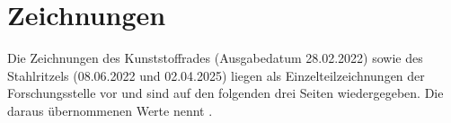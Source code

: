 \section{Zeichnungen}
\label{sec:anhang_a}

Die Zeichnungen des Kunststoffrades (Ausgabedatum 28.02.2022) sowie des Stahlritzels (08.06.2022 und 02.04.2025) liegen als Einzelteilzeichnungen der Forschungsstelle vor und sind auf den folgenden drei Seiten wiedergegeben. Die daraus übernommenen Werte nennt .




